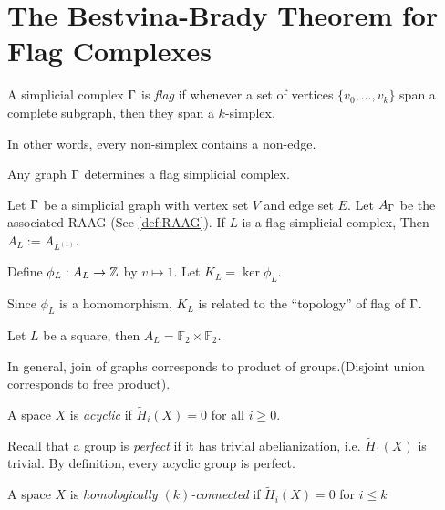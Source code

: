 \section{The Bestvina-Brady Theorem for Flag Complexes} 
\label{sec:L06-W03D1}

\begin{definition}
    \label{def:flag-simplicial-complex}
    A simplicial complex \(\Gamma\) is \emph{flag} if whenever a set of vertices \(\{v_0, \dots, v_k\}\) span a complete subgraph, then they span a \(k\)-simplex.
\end{definition}

In other words, every non-simplex contains a non-edge.

Any graph \(\Gamma\) determines a flag simplicial complex.

\begin{definition}
    \label{def:flag-RAAG}
    Let \(\Gamma\) be a simplicial graph with vertex set \(V\) and edge set \(E\). Let \(A_\Gamma\) be the associated RAAG (See \cref{def:RAAG}). If \(L\) is a flag simplicial complex, Then \(A_L:= A_{L^{(1)}}\).

    Define \(\phi_L:A_L \to \mathbb{Z}\) by \(v\mapsto 1\). Let \(K_L = \ker \phi_L\).
\end{definition}

\begin{remark}
    Since \(\phi_L\) is a homomorphism, \(K_L\) is related to the ``topology'' of flag of  \(\Gamma\).
\end{remark}

\begin{example}
    \label{ex:flag-RAAG}
    Let \(L\) be a square, then \(A_L = \mathbb{F}_2 \times \mathbb{F}_2\).

    In general, join of graphs corresponds to product of groups.(Disjoint union corresponds to free product).
\end{example}


\begin{definition}
    \label{def:cyclic-space}
    A space \(X\) is \emph{acyclic} if \(\tilde H_i (X) = 0\) for all \(i \geq 0\).
\end{definition}


Recall that a group is \emph{perfect} if it has trivial abelianization, i.e. \(\tilde H_1(X) \) is trivial. By definition, every acyclic group is perfect.

\begin{definition}
    \label{def:homologically-k-connected}
    A space \(X\) is \emph{homologically \((k)\)-connected} if \(\tilde H_i (X)=0\) for \(i \leq k\)
\end{definition}

